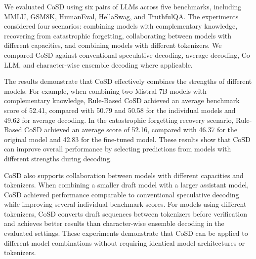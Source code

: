 \documentclass[11pt]{article}
\begin{document}
We evaluated CoSD using six pairs of LLMs across five benchmarks, including MMLU, GSM8K, HumanEval, HellaSwag, and TruthfulQA. The experiments considered four scenarios: combining models with complementary knowledge, recovering from catastrophic forgetting, collaborating between models with different capacities, and combining models with different tokenizers. We compared CoSD against conventional speculative decoding, average decoding, Co-LLM, and character-wise ensemble decoding where applicable.

The results demonstrate that CoSD effectively combines the strengths of different models. For example, when combining two Mistral-7B models with complementary knowledge, Rule-Based CoSD achieved an average benchmark score of 52.41, compared with 50.79 and 50.58 for the individual models and 49.62 for average decoding. In the catastrophic forgetting recovery scenario, Rule-Based CoSD achieved an average score of 52.16, compared with 46.37 for the original model and 42.83 for the fine-tuned model. These results show that CoSD can improve overall performance by selecting predictions from models with different strengths during decoding.

\begin{table}[t]
\centering
\caption{Performance of CoSD in complementary knowledge fusion and catastrophic forgetting recovery. Scores are averaged across five benchmarks.}
\label{tab:cosd_results}
\end{table}

CoSD also supports collaboration between models with different capacities and tokenizers. When combining a smaller draft model with a larger assistant model, CoSD achieved performance comparable to conventional speculative decoding while improving several individual benchmark scores. For models using different tokenizers, CoSD converts draft sequences between tokenizers before verification and achieves better results than character-wise ensemble decoding in the evaluated settings. These experiments demonstrate that CoSD can be applied to different model combinations without requiring identical model architectures or tokenizers.
\end{document}
